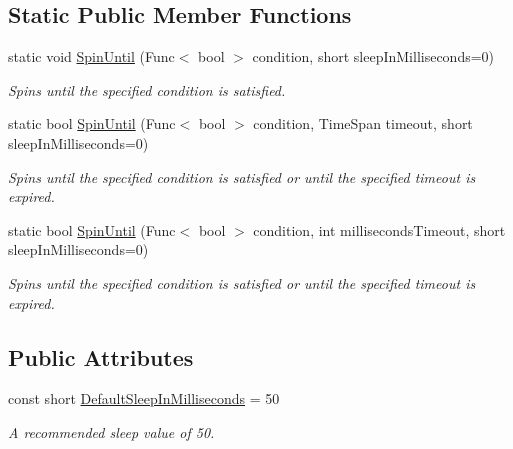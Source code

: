 \subsection*{Static Public Member Functions}
\begin{DoxyCompactItemize}
\item 
static void \hyperlink{structCqrs_1_1Infrastructure_1_1SpinWait_ae6b5bdef734568b515fa8d2ed04af9bb_ae6b5bdef734568b515fa8d2ed04af9bb}{Spin\+Until} (Func$<$ bool $>$ condition, short sleep\+In\+Milliseconds=0)
\begin{DoxyCompactList}\small\item\em Spins until the specified condition is satisfied. \end{DoxyCompactList}\item 
static bool \hyperlink{structCqrs_1_1Infrastructure_1_1SpinWait_a3b8ad06e785634704c7555bd8d0f1ac9_a3b8ad06e785634704c7555bd8d0f1ac9}{Spin\+Until} (Func$<$ bool $>$ condition, Time\+Span timeout, short sleep\+In\+Milliseconds=0)
\begin{DoxyCompactList}\small\item\em Spins until the specified condition is satisfied or until the specified timeout is expired. \end{DoxyCompactList}\item 
static bool \hyperlink{structCqrs_1_1Infrastructure_1_1SpinWait_a9132e663f1bd0c28ec846cf026ab1c5f_a9132e663f1bd0c28ec846cf026ab1c5f}{Spin\+Until} (Func$<$ bool $>$ condition, int milliseconds\+Timeout, short sleep\+In\+Milliseconds=0)
\begin{DoxyCompactList}\small\item\em Spins until the specified condition is satisfied or until the specified timeout is expired. \end{DoxyCompactList}\end{DoxyCompactItemize}
\subsection*{Public Attributes}
\begin{DoxyCompactItemize}
\item 
const short \hyperlink{structCqrs_1_1Infrastructure_1_1SpinWait_a1d7345222f47db5e45af305591b92da5_a1d7345222f47db5e45af305591b92da5}{Default\+Sleep\+In\+Milliseconds} = 50
\begin{DoxyCompactList}\small\item\em A recommended sleep value of 50. \end{DoxyCompactList}\end{DoxyCompactItemize}
